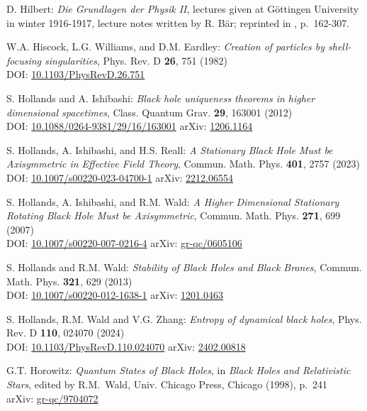 \begin{thebibliography}{123}
D. Hilbert:
{\em Die Grundlagen der Physik II},
lectures given at Göttingen University in winter 1916-1917,
lecture notes written by R. Bär; reprinted
in \cite{SauerM09}, p.~162-307.

W.A. Hiscock, L.G. Williams, and D.M. Eardley:
{\em Creation of particles by shell-focusing singularities},
Phys. Rev. D {\bf 26}, 751 (1982)\\
DOI: \href{https://doi.org/10.1103/PhysRevD.26.751}{10.1103/PhysRevD.26.751}

S. Hollands and A. Ishibashi:
{\em Black hole uniqueness theorems in higher dimensional spacetimes},
Class. Quantum Grav. {\bf 29}, 163001 (2012)\\
DOI: \href{https://doi.org/10.1088/0264-9381/29/16/163001}{10.1088/0264-9381/29/16/163001}\hfill
arXiv: \href{https://arxiv.org/abs/1206.1164}{1206.1164}

S. Hollands, A. Ishibashi, and H.S. Reall:
{\em A Stationary Black Hole Must be Axisymmetric in Effective Field Theory},
Commun. Math. Phys. {\bf 401}, 2757 (2023)\\
DOI: \href{https://doi.org/10.1007/s00220-023-04700-1}{10.1007/s00220-023-04700-1}\hfill
arXiv: \href{https://arxiv.org/abs/2212.06554}{2212.06554}

S. Hollands, A. Ishibashi, and R.M. Wald:
{\em A Higher Dimensional Stationary Rotating Black Hole Must be Axisymmetric},
Commun. Math. Phys. {\bf 271}, 699 (2007)\\
DOI: \href{https://doi.org/10.1007/s00220-007-0216-4}{10.1007/s00220-007-0216-4}\hfill
arXiv: \href{https://arxiv.org/abs/gr-qc/0605106}{gr-qc/0605106}

S. Hollands and R.M. Wald:
{\em Stability of Black Holes and Black Branes},
Commun. Math. Phys. {\bf 321}, 629 (2013)\\
DOI: \href{https://doi.org/10.1007/s00220-012-1638-1}{10.1007/s00220-012-1638-1}\hfill
arXiv: \href{https://arxiv.org/abs/1201.0463}{1201.0463}

S. Hollands, R.M. Wald and V.G. Zhang:
{\em Entropy of dynamical black holes},
Phys. Rev. D {\bf 110}, 024070 (2024)\\
DOI: \href{https://doi.org/10.1103/PhysRevD.110.024070}{10.1103/PhysRevD.110.024070}\hfill
arXiv: \href{https://arxiv.org/abs/2402.00818}{2402.00818}

G.T. Horowitz:
{\em Quantum States of Black Holes},
in {\em Black Holes and Relativistic Stars}, edited by R.M.~Wald,
Univ. Chicago Press, Chicago (1998), p.~241\\
arXiv: \href{https://arxiv.org/abs/gr-qc/9704072}{gr-qc/9704072}


\end{thebibliography}
